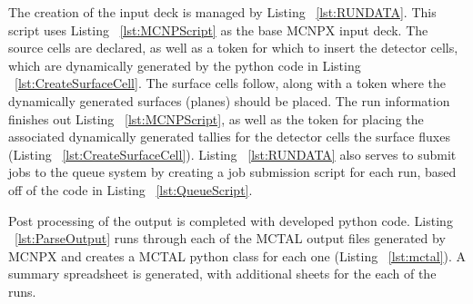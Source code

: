 \label{sec:RPM8Listings}
The creation of the input deck is managed by Listing ~\ref{lst:RUNDATA}.
This script uses Listing ~\ref{lst:MCNPScript} as the base MCNPX input deck.
The source cells are declared, as well as a token for which to insert the detector cells, which are dynamically generated by the python code in Listing ~\ref{lst:CreateSurfaceCell}.
The surface cells follow, along with a token where the dynamically generated surfaces (planes) should be placed.
The run information finishes out Listing ~\ref{lst:MCNPScript}, as well as the token for placing the associated dynamically generated tallies for the detector cells the surface fluxes (Listing ~\ref{lst:CreateSurfaceCell}).
Listing ~\ref{lst:RUNDATA} also serves to submit jobs to the queue system by creating a job submission script for each run, based off of the code in Listing ~\ref{lst:QueueScript}.

Post processing of the output is completed with developed python code.
Listing ~\ref{lst:ParseOutput} runs through each of the MCTAL output files generated by MCNPX and creates a MCTAL python class for each one (Listing ~\ref{lst:mctal}).
A summary spreadsheet is generated, with additional sheets for the each of the runs.









